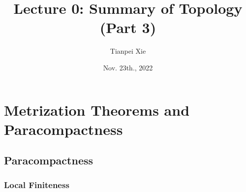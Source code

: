 \documentclass[11pt]{article}
\begin{document}
\title{Lecture 0: Summary of Topology (Part 3)}
\author{ Tianpei Xie}
\date{Nov. 23th., 2022}
\maketitle
\tableofcontents
\newpage
\section{Metrization Theorems and Paracompactness}
\subsection{Paracompactness}
\subsubsection{Local Finiteness}
\end{document}
